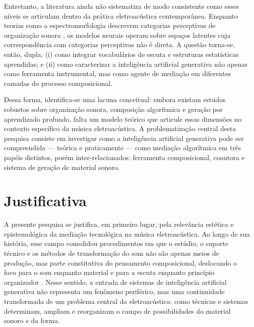 Entretanto, a literatura ainda não sistematiza de modo consistente como esses níveis se articulam dentro da prática eletroacústica contemporânea. Enquanto teorias como a espectromorfologia descrevem categorias perceptivas de organização sonora \cite{smalley1997spectromorphology}, os modelos neurais operam sobre espaços latentes cuja correspondência com categorias perceptivas não é direta. A questão torna-se, então, dupla: (i) como integrar vocabulários de escuta e estruturas estatísticas aprendidas; e (ii) como caracterizar a inteligência artificial generativa não apenas como ferramenta instrumental, mas como agente de mediação em diferentes camadas do processo composicional.

Dessa forma, identifica-se uma lacuna conceitual: embora existam estudos robustos sobre organização sonora, composição algorítmica e geração por aprendizado profundo, falta um modelo teórico que articule essas dimensões no contexto específico da música eletroacústica. A problematização central desta pesquisa consiste em investigar como a inteligência artificial generativa pode ser compreendida — teórica e praticamente — como mediação algorítmica em três papéis distintos, porém inter-relacionados: ferramenta composicional, coautora e sistema de geração de material sonoro.


\section{Justificativa}

A presente pesquisa se justifica, em primeiro lugar, pela relevância estética e epistemológica da mediação tecnológica na música eletroacústica. Ao longo de sua história, esse campo consolidou procedimentos em que o estúdio, o suporte técnico e os métodos de transformação do som não são apenas meios de produção, mas parte constitutiva do pensamento composicional, deslocando o foco para o som enquanto material e para a escuta enquanto princípio organizador \cite{schaeffer1966traite,smalley1997spectromorphology,landy2007soundorganization}. Nesse sentido, a entrada de sistemas de inteligência artificial generativa não representa um fenômeno periférico, mas uma continuidade transformada de um problema central da eletroacústica: como técnicas e sistemas determinam, ampliam e reorganizam o campo de possibilidades do material sonoro e da forma.

